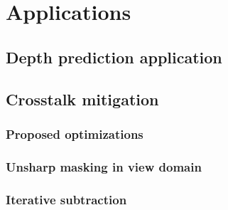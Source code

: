 \chapter{Applications}
\label{chap:applicatons}

\section{Depth prediction application}

\section{Crosstalk mitigation}
\subsection{Proposed optimizations}
\subsection{Unsharp masking in view domain}
\subsection{Iterative subtraction}
